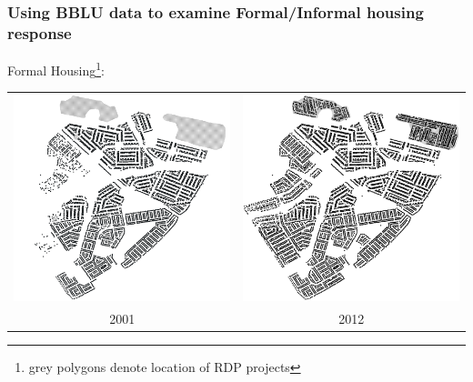 \documentclass[aspectratio=149]{beamer}
\begin{document}
\begin{frame}
\frametitle{Using BBLU data to examine Formal/Informal housing response}

Formal Housing\footnote{grey polygons denote location of RDP projects}:

\vspace{4mm}

\begin{tabular}{cc}
 \includegraphics[scale=0.18]{pre_formal.png} & \includegraphics[scale=0.18]{post_formal.png} \\
  2001 & 2012 \\
\end{tabular}

\end{frame}
\end{document}
